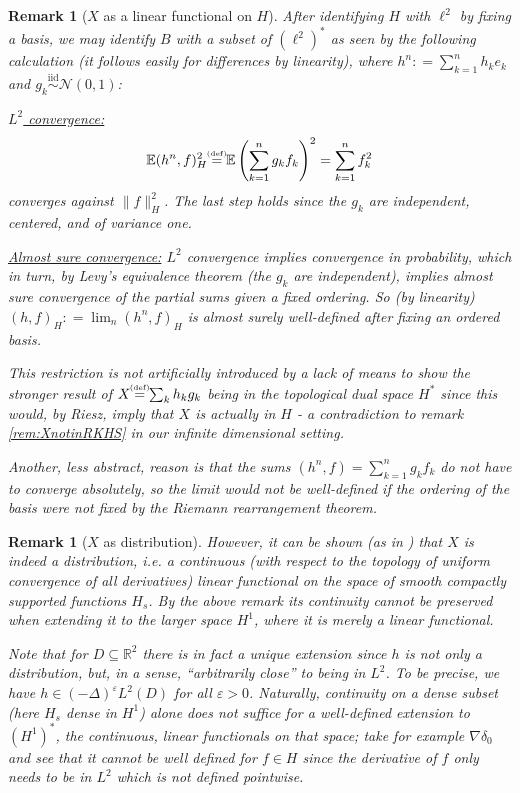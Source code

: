 \documentclass[11pt,reqno]{amsart}
\numberwithin{equation}{section}
\newtheorem{rem}[thm]{Remark}
\newcommand{\eqbydef}{\mathrel{\stackrel{\hspace*{-3mm}\text{\tiny(def)}\hspace*{-3mm}}{=}}}
\newcommand{\deq}{\mathrel{\mathop:}=}
\newcommand{\iidnormal}{\mathrel{\stackrel{\text{iid}}{\sim}}\mathcal N(0,1)}
\newcommand{\eps}{\varepsilon}
\begin{document}
\begin{rem}[$X$ as a linear functional on $H$]\label{rem:XlikeinKL}
	After identifying $H$ with $\ell^2$ by fixing a basis, we may identify $B$ with a subset of $(\ell^2)^*$ as seen by the following calculation (it follows easily for differences by linearity), where $h^n\deq \sum_{k=1}^n h_ke_k$ and $g_k\iidnormal$:
	
	\underline{$L^2$ convergence:}
	\begin{equation}\label{eq:varianceofHasRandomDistribution}
		\mathbb E(h^n,f)_H^2 \eqbydef \mathbb E\left(\sum_{k=1}^n g_k f_k\right)^2 = \sum_{k=1}^n f_k^2
	\end{equation} converges against $\|f\|_H^2$. The last step holds since the $g_k$ are independent, centered, and of variance one.
	
	\underline{Almost sure convergence:} $L^2$ convergence implies convergence in probability, which in turn, by Levy's equivalence theorem (the $g_k$ are independent), implies almost sure convergence of the \emph{partial sums} given a fixed ordering.
		So (by linearity) $(h,f)_H\deq\lim_n(h^n,f)_H$ is almost surely well-defined after fixing an ordered basis.
	
	This restriction is not artificially introduced by a lack of means to show the stronger result of $X\eqbydef \sum_k h_kg_k$ being in the topological dual space $H^*$ since this would, by Riesz, imply that $X$ is actually in $H$ - a contradiction to remark \ref{rem:XnotinRKHS} in our infinite dimensional setting.
	
	Another, less abstract, reason is that the sums $(h^n,f)=\sum_{k=1}^ng_kf_k$ do not have to converge absolutely, so the limit would not be well-defined if the ordering of the basis were not fixed by the Riemann rearrangement theorem.
\end{rem}

\begin{rem}[$X$ as distribution]	\label{rem:spaceofX}
	However, it can be shown (as in \cite{She07}) that $X$ is indeed a distribution, i.e. a continuous (with respect to the topology of uniform convergence of all derivatives) linear functional on the space of smooth compactly supported functions $H_s$. By the above remark its continuity cannot be preserved when extending it to the larger space $H^1$, where it is merely a linear functional.
	
	Note that for $D\subseteq\mathbb R^2$ there is in fact a unique extension since $h$ is not only a distribution, but, in a sense, ``arbitrarily close'' to being in $L^2$. To be precise, we have $h\in (-\Delta)^\eps L^2(D)$ for all $\eps>0$. Naturally, continuity on a dense subset (here $H_s$ dense in $H^1$) alone does not suffice for a well-defined extension to $(H^1)^*$, the \emph{continuous}, linear functionals on that space; take for example $\nabla\delta_0$ and see that it cannot be well defined for $f\in H$ since the derivative of $f$ only needs to be in $L^2$ which is not defined pointwise.
\end{rem}
\end{document}
